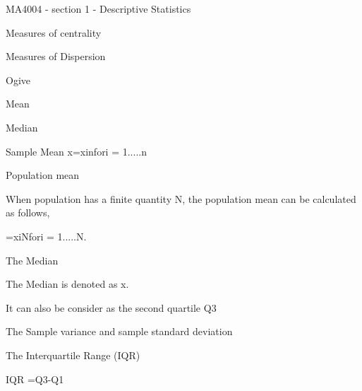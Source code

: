 MA4004 - section 1 - Descriptive Statistics
 
Measures of centrality
 
Measures of Dispersion
 
Ogive
 
Mean
 
Median
 
 
Sample Mean
x=xinfori = 1.....n 
 
 
Population mean

 
When population has a finite quantity N, the population mean can be calculated as follows,
 
=xiNfori = 1.....N.
 
The Median
 
The Median is denoted as x.
 
It can also be consider as the second quartile Q3
 
The Sample variance and sample standard deviation
 
 
 
The Interquartile Range (IQR)
 
IQR =Q3-Q1
